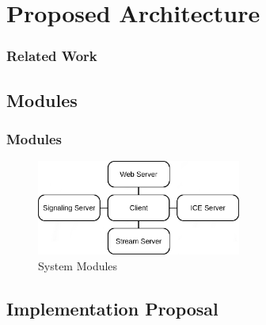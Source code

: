 \documentclass[t]{beamer}
\begin{document}



\section{Proposed Architecture}\label{arch}

\begin{frame}[t,shrink]
\frametitle{Related Work} 
\end{frame}

\subsection{Modules}

	\begin{frame}[c]
		\frametitle{Modules}
		\begin{figure}[H]
			\includegraphics[width=0.6\textwidth]{figures/archs.png}
			\caption{System Modules}
		\end{figure}
	\end{frame}

\subsection{Implementation Proposal}
\end{document}
